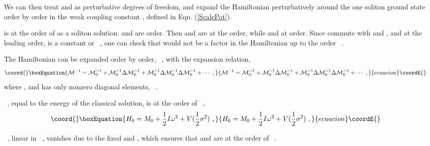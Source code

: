 \documentclass[a4paper,a4paper]{article}
\def\da{{\dot{a}}}
\begin{document}
We can then treat \coordHE{} and \coordHE{} as 
perturbative degrees of freedom, and expand the Hamiltonian perturbatively around the 
one soliton ground state order by  
order in the weak coupling constant \coordHE{} , defined in Eqn. (\ref{ScalePot}).

\myHighlight{$\sigma$}\coordHE{} is at the order of \coordHE{} as a soliton solution. \coordHE{} and \coordHE{} are 
\coordHE{} order. Then \coordHE{} and \coordHE{} are at the \coordHE{} order, while \coordHE{} and 
\myHighlight{$p_{I\da}$}\coordHE{} at \coordHE{} order. 
Since \coordHE{} commute with \coordHE{} and \coordHE{} , and at the leading \coordHE{} order, 
\coordHE{} is a constant or \coordHE{}\ , one can check that   
\coordHE{} would not be a factor in the Hamiltonian up to the order \coordHE{}\ . 

The Hamiltonian can be expanded order by order, \coordHE{}\ ,
with the expansion relation, 
\begin{equation}\coord{}\boxEquation{
 {\cal M}^{-1}={\cal M}_0^{-1}+{\cal M}_0^{-1}\Delta{\cal M}_0^{-1}+
 {\cal M}_0^{-1}\Delta{\cal M}_0^{-1}\Delta{\cal M}_0^{-1}+\cdots\ , 
}{
 {\cal M}^{-1}={\cal M}_0^{-1}+{\cal M}_0^{-1}\Delta{\cal M}_0^{-1}+
 {\cal M}_0^{-1}\Delta{\cal M}_0^{-1}\Delta{\cal M}_0^{-1}+\cdots\ , 
}{ecuacion}\coordE{}\end{equation}
where \coordHE{}, and \coordHE{} has only nonzero diagonal   
elements, \coordHE{}\ .  

\coordHE{}\ , equal to the energy of the
classical solution, is at the order of \coordHE{}\ , 
\begin{equation}\coord{}\boxEquation{
  H_0=M_0+\frac 12I\omega^2+V(\frac 12\sigma^2)\ ,
}{
  H_0=M_0+\frac 12I\omega^2+V(\frac 12\sigma^2)\ ,
}{ecuacion}\coordE{}\end{equation}

\coordHE{}\ , linear in \myHighlight{$\chi$}\coordHE{}\ , vanishes due to the fixed \coordHE{} and \coordHE{} , 
which ensures that \coordHE{} and \coordHE{} are at the order of \coordHE{}\ .  
\end{document}
